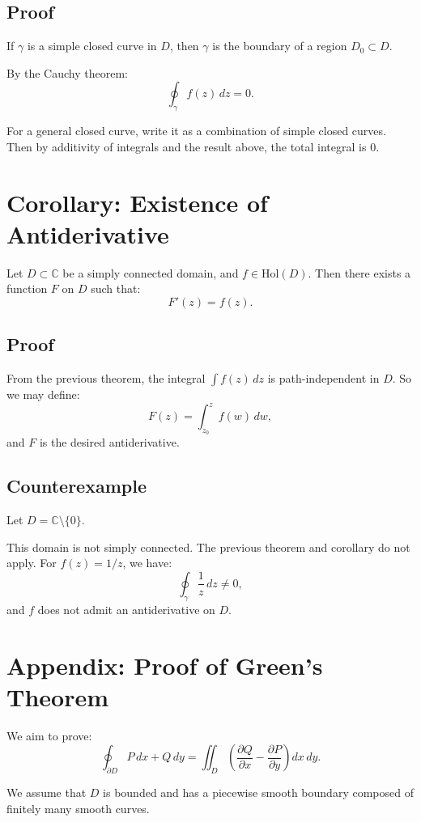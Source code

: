 \documentclass[12pt]{article}
\theoremstyle{definition} %
\theoremstyle{plain} %
\begin{document}
\subsection*{Proof}

If $\gamma$ is a simple closed curve in $D$, then $\gamma$ is the boundary of a region $D_0 \subset D$.

By the Cauchy theorem:
\[
\oint_{\gamma} f(z)\,dz = 0.
\]

For a general closed curve, write it as a combination of simple closed curves. Then by additivity of integrals and the result above, the total integral is $0$.

\section*{Corollary: Existence of Antiderivative}

Let $D \subset \mathbb{C}$ be a simply connected domain, and $f \in \text{Hol}(D)$. Then there exists a function $F$ on $D$ such that:
\[
F'(z) = f(z).
\]

\subsection*{Proof}

From the previous theorem, the integral $\int f(z)\,dz$ is path-independent in $D$. So we may define:
\[
F(z) = \int_{z_0}^{z} f(w)\,dw,
\]
and $F$ is the desired antiderivative.

\subsection*{Counterexample}

Let $D = \mathbb{C} \setminus \{0\}$.

This domain is not simply connected. The previous theorem and corollary do not apply. For $f(z) = 1/z$, we have:
\[
\oint_{\gamma} \frac{1}{z}\,dz \neq 0,
\]
and $f$ does not admit an antiderivative on $D$.

\section*{Appendix: Proof of Green’s Theorem}

We aim to prove:
\[
\oint_{\partial D} P\,dx + Q\,dy = \iint_D \left( \frac{\partial Q}{\partial x} - \frac{\partial P}{\partial y} \right) dx\,dy.
\]

We assume that $D$ is bounded and has a piecewise smooth boundary composed of finitely many smooth curves.
\end{document}

